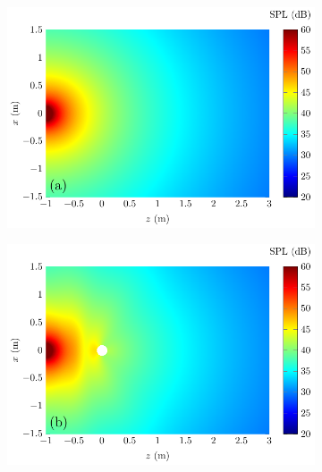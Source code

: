 \begin{figure}[!htb]
    \centering
    \begin{subfigure}{0.49\textwidth}
        \centering
        \includegraphics[width = \textwidth]{fig/CircPiston_NoSphere_2D_500Hz_210718D_211211N}
    \end{subfigure}
    \begin{subfigure}{0.49\textwidth}
        \centering
        \includegraphics[width = \textwidth]{fig/CircPiston_Sphere_2D_500Hz_210718D_211211O}
    \end{subfigure}

\end{figure}

